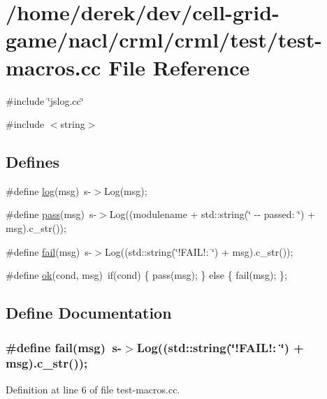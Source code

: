 \hypertarget{test-macros_8cc}{
\section{/home/derek/dev/cell-\/grid-\/game/nacl/crml/crml/test/test-\/macros.cc File Reference}
\label{test-macros_8cc}
}
{\ttfamily \#include \char`\"{}jslog.cc\char`\"{}}\par
{\ttfamily \#include $<$string$>$}\par
\subsection*{Defines}
\begin{DoxyCompactItemize}
\item 
\#define \hyperlink{test-macros_8cc_a642fd9241bc9e4219ea15503ca87fefb}{log}(msg)~s-\/$>$Log(msg);
\item 
\#define \hyperlink{test-macros_8cc_af496d3b8121eb066859c5af577597d9c}{pass}(msg)~s-\/$>$Log((modulename + std::string(\char`\"{} -\/-\/ passed: \char`\"{}) + msg).c\_\-str());
\item 
\#define \hyperlink{test-macros_8cc_a05ec25e11ffdcaea9c4627c906388dd1}{fail}(msg)~s-\/$>$Log((std::string(\char`\"{}!FAIL!: \char`\"{}) + msg).c\_\-str());
\item 
\#define \hyperlink{test-macros_8cc_afaeb9641e4b11cff7242820dbb1c156d}{ok}(cond, msg)~if(cond) \{ pass(msg); \} else \{ fail(msg); \};
\end{DoxyCompactItemize}


\subsection{Define Documentation}
\hypertarget{test-macros_8cc_a05ec25e11ffdcaea9c4627c906388dd1}{
\subsubsection[{fail}]{\setlength{\rightskip}{0pt plus 5cm}\#define fail(msg)~s-\/$>$Log((std::string(\char`\"{}!FAIL!: \char`\"{}) + msg).c\_\-str());}}
\label{test-macros_8cc_a05ec25e11ffdcaea9c4627c906388dd1}


Definition at line 6 of file test-\/macros.cc.

